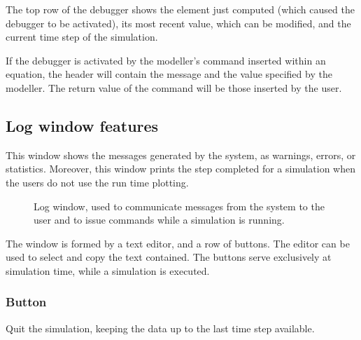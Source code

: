 \documentclass [11pt,a4paper] {book}
\begin{document}
The top row of the debugger shows the element just computed (which caused the debugger to be activated), its most recent value, which can be modified, and the current time step of the simulation. 

If the debugger is activated by the modeller's command  inserted within an equation, the header will contain the message and the value specified by the modeller. The return value of the command will be those inserted by the user.



\subsection{Log window features}
This window shows the messages generated by the system, as warnings, errors, or statistics. Moreover, this window prints the step completed for a simulation when the users do not use the run time plotting.


\begin{figure}[ht]
  \centering
  \caption{\small Log window, used to communicate messages from the system to the user and to issue commands while a simulation is running.}
   \label{fig:log}
\end{figure}


The window is formed by a text editor, and a row of buttons. The editor can be used to select and copy the text contained. The buttons serve exclusively at simulation time, while a simulation is executed. 

\subsubsection{Button }

Quit the simulation, keeping the data up to the last time step available.
\end{document}
